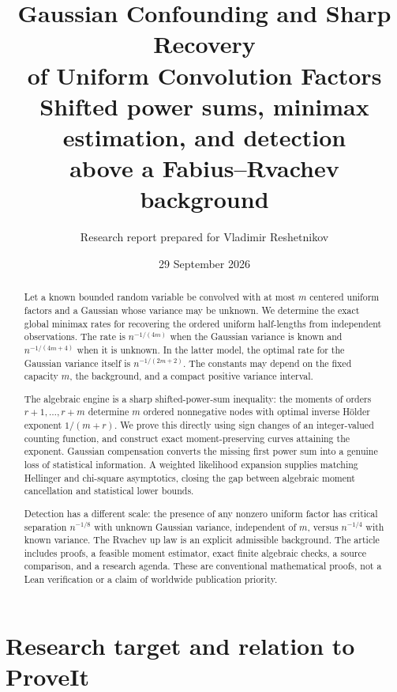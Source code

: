 \documentclass[11pt,a4paper]{article}
\title{\textbf{Gaussian Confounding and Sharp Recovery\\of Uniform Convolution Factors}\\[0.55em]
\large Shifted power sums, minimax estimation, and detection\\above a Fabius--Rvachev background}
\author{Research report prepared for Vladimir Reshetnikov}
\date{29 September 2026}
\numberwithin{equation}{section}
\theoremstyle{definition}
\theoremstyle{remark}
\begin{document}
\maketitle
\begin{abstract}
Let a known bounded random variable be convolved with at most $m$ centered
uniform factors and a Gaussian whose variance may be unknown. We determine
the exact global minimax rates for recovering the ordered uniform half-lengths
from independent observations. The rate is $n^{-1/(4m)}$ when the Gaussian
variance is known and $n^{-1/(4m+4)}$ when it is unknown. In the latter model,
the optimal rate for the Gaussian variance itself is $n^{-1/(2m+2)}$.
The constants may depend on the fixed capacity $m$, the background, and a
compact positive variance interval.

The algebraic engine is a sharp shifted-power-sum inequality: the moments of
orders $r+1,\ldots,r+m$ determine $m$ ordered nonnegative nodes with optimal
inverse H\"older exponent $1/(m+r)$. We prove this directly using sign changes
of an integer-valued counting function, and construct exact moment-preserving
curves attaining the exponent. Gaussian compensation converts the missing
first power sum into a genuine loss of statistical information. A weighted
likelihood expansion supplies matching Hellinger and chi-square asymptotics,
closing the gap between algebraic moment cancellation and statistical lower
bounds.

Detection has a different scale: the presence of any nonzero uniform factor
has critical separation $n^{-1/8}$ with unknown Gaussian variance, independent
of $m$, versus $n^{-1/4}$ with known variance. The Rvachev up law is an explicit
admissible background. The article includes proofs, a feasible moment estimator,
exact finite algebraic checks, a source comparison, and a research agenda.
These are conventional mathematical proofs, not a Lean verification or a claim
of worldwide publication priority.
\end{abstract}
\newpage
\setcounter{tocdepth}{1}
\tableofcontents
\newpage

\section{Research target and relation to ProveIt}
\label{sec:scope}
\end{document}
